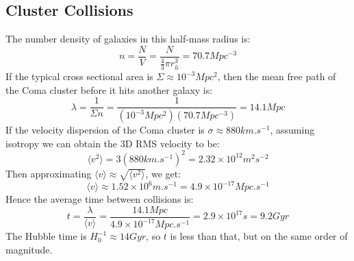 \subsection{Cluster Collisions}
The number density of galaxies in this half-mass radius is:
\begin{equation}
    \boxed{n = \frac{N}{V} = \frac{N}{\frac{4}{3}\pi r_h^3} = 70.7 \si{Mpc^{-3}}}
\end{equation}
If the typical cross sectional area is $\Sigma \approx 10^{-3}\si{Mpc^2}$, then the mean free path of the Coma cluster before it hits another galaxy is:
\begin{equation}
    \boxed{\lambda = \frac{1}{\Sigma n} = \frac{1}{(10^{-3}\si{Mpc^2})(70.7 \si{Mpc^{-3}})} = 14.1 \si{Mpc}}
\end{equation}
If the velocity dispersion of the Coma cluster is $\sigma \approx 880\si{km.s^{-1}}$,  assuming isotropy we can obtain the 3D RMS velocity to be:
\begin{equation}
    \langle v^2 \rangle = 3(880\si{km.s^{-1}})^2 = 2.32 \times 10^{12} \si{m^2 s^{-2}}
\end{equation}
Then approximating $\langle v \rangle \approx \sqrt{\langle v^2 \rangle}$, we get:
\begin{equation}
    \langle v\rangle \approx 1.52 \times 10^6 \si{m.s^{-1}} = 4.9 \times 10^{-17} \si{Mpc.s^{-1}}
\end{equation}
Hence the average time between collisions is:
\begin{equation}
    \boxed{t = \frac{\lambda}{\langle v \rangle} = \frac{14.1 \si{Mpc}}{4.9 \times 10^{-17} \si{Mpc.s^{-1}}} = 2.9 \times 10^{17}\si{s} = 9.2 \si{Gyr}}
\end{equation}
The Hubble time is $H_0^{-1} \approx 14\si{Gyr}$, so $t$ is less than that, but on the same order of magnitude.

